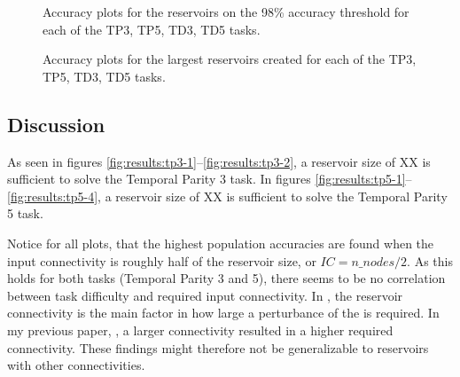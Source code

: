\begin{figure}[ht]
    \centering
    \caption{Accuracy plots for the reservoirs on the 98\% accuracy threshold for each of the TP3, TP5, TD3, TD5 tasks.}

    \label{fig:accuracy-threshold-size}
    \resizebox{\textwidth}{!}{
        \subfloat[TP3, N=20]{
            
        }
        \subfloat[TP5, N=90]{
            
        }
    }
    \resizebox{\textwidth}{!}{
        \subfloat[TD3, N=10]{
            
        }
        \subfloat[TD5, N=55]{
            
        }
    }
\end{figure}

\begin{figure}[ht]
    \centering
    \caption{Accuracy plots for the largest reservoirs created for each of the TP3, TP5, TD3, TD5 tasks.}

    \label{fig:accuracy-max-size}
    \resizebox{\textwidth}{!}{
        \subfloat[TP3, N=100]{
            
        }
        \subfloat[TP5, N=140]{
            
        }
    }
    \resizebox{\textwidth}{!}{
        \subfloat[TD3, N=30]{
            
        }
        \subfloat[TD5, N=65]{
            
        }
    }
\end{figure}

\subsection{Discussion}

As seen in figures \ref{fig:results:tp3-1}–\ref{fig:results:tp3-2},
a reservoir size of XX is sufficient to solve the Temporal Parity 3 task.
In figures \ref{fig:results:tp5-1}–\ref{fig:results:tp5-4},
a reservoir size of XX is sufficient to solve the Temporal Parity 5 task.

Notice for all plots, that the highest population accuracies are found when the input connectivity is roughly half of the reservoir size, or $IC=n\_nodes/2$.
As this holds for both tasks (Temporal Parity 3 and 5), there seems to be no correlation between task difficulty and required input connectivity.
In , the reservoir connectivity is the main factor in how large a perturbance of the is required.
In my previous paper, , a larger connectivity resulted in a higher required connectivity.
These findings might therefore not be generalizable to reservoirs with other connectivities.
